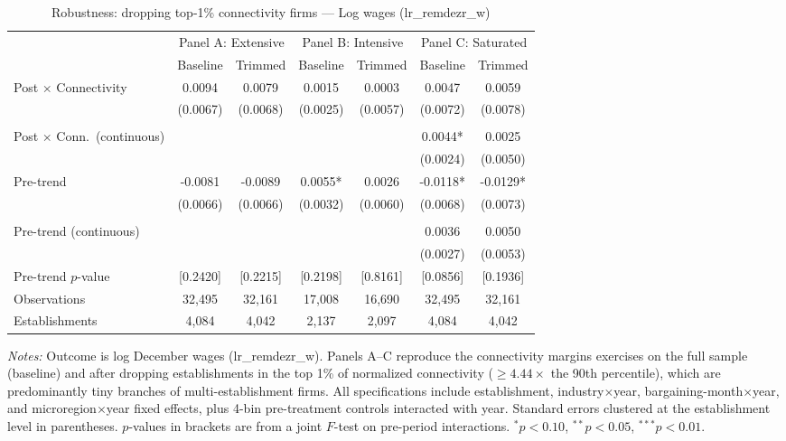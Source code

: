 \documentclass[12pt]{article}
\begin{document}
\begin{table}[H]
\centering
\caption{Robustness: dropping top-1\% connectivity firms --- Log wages (lr\_remdezr\_w)}
\label{tab:trim_robustness}
\begin{threeparttable}
\begin{tabular}{lcccccc}
\toprule
 & \multicolumn{2}{c}{Panel A: Extensive} & \multicolumn{2}{c}{Panel B: Intensive} & \multicolumn{2}{c}{Panel C: Saturated} \\
\cmidrule(lr){2-3}\cmidrule(lr){4-5}\cmidrule(lr){6-7}
 & Baseline & Trimmed & Baseline & Trimmed & Baseline & Trimmed \\
\midrule
Post $\times$ Connectivity & 0.0094 & 0.0079 & 0.0015 & 0.0003 & 0.0047 & 0.0059 \\
 & (0.0067) & (0.0068) & (0.0025) & (0.0057) & (0.0072) & (0.0078) \\
\\[-4pt]
Post $\times$ Conn.\ (continuous) &  &  &  &  & 0.0044* & 0.0025 \\
 &  &  &  &  & (0.0024) & (0.0050) \\
\midrule
Pre-trend & -0.0081 & -0.0089 & 0.0055* & 0.0026 & -0.0118* & -0.0129* \\
 & (0.0066) & (0.0066) & (0.0032) & (0.0060) & (0.0068) & (0.0073) \\
\\[-4pt]
Pre-trend (continuous) &  &  &  &  & 0.0036 & 0.0050 \\
 &  &  &  &  & (0.0027) & (0.0053) \\
\midrule
Pre-trend $p$-value & [0.2420] & [0.2215] & [0.2198] & [0.8161] & [0.0856] & [0.1936] \\
\midrule
Observations & 32{,}495 & 32{,}161 & 17{,}008 & 16{,}690 & 32{,}495 & 32{,}161 \\
Establishments & 4{,}084 & 4{,}042 & 2{,}137 & 2{,}097 & 4{,}084 & 4{,}042 \\
\bottomrule
\end{tabular}
\begin{tablenotes}[flushleft]\footnotesize
\item \textit{Notes:} Outcome is log December wages (lr\_remdezr\_w). Panels A--C reproduce the connectivity margins exercises on the full sample (baseline) and after dropping establishments in the top 1\% of normalized connectivity ($\geq 4.44\times$ the 90th percentile), which are predominantly tiny branches of multi-establishment firms. All specifications include establishment, industry$\times$year, bargaining-month$\times$year, and microregion$\times$year fixed effects, plus 4-bin pre-treatment controls interacted with year. Standard errors clustered at the establishment level in parentheses. $p$-values in brackets are from a joint $F$-test on pre-period interactions. $^{*}p<0.10$, $^{**}p<0.05$, $^{***}p<0.01$.
\end{tablenotes}
\end{threeparttable}
\end{table}
\end{document}
